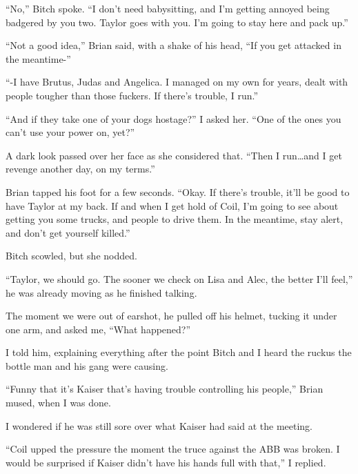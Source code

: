 ``No,'' Bitch spoke.  ``I don't need babysitting, and I'm getting annoyed being badgered by you two.  Taylor goes with you.  I'm going to stay here and pack up.''



``Not a good idea,'' Brian said, with a shake of his head, ``If you get attacked in the meantime-''



``-I have Brutus, Judas and Angelica.  I managed on my own for years, dealt with people tougher than those fuckers.  If there's trouble, I run.''



``And if they take one of your dogs hostage?'' I asked her.  ``One of the ones you can't use your power on, yet?''



A dark look passed over her face as she considered that.  ``Then I run\ldots and I get revenge another day, on my terms.''



Brian tapped his foot for a few seconds.  ``Okay.  If there's trouble, it'll be good to have Taylor at my back.  If and when I get hold of Coil, I'm going to see about getting you some trucks, and people to drive them.  In the meantime, stay alert, and don't get yourself killed.''



Bitch scowled, but she nodded.



``Taylor, we should go.  The sooner we check on Lisa and Alec, the better I'll feel,'' he was already moving as he finished talking.



The moment we were out of earshot, he pulled off his helmet, tucking it under one arm, and asked me, ``What happened?''



I told him, explaining everything after the point Bitch and I heard the ruckus the bottle man and his gang were causing.



``Funny that it's Kaiser that's having trouble controlling his people,'' Brian mused, when I was done.



I wondered if he was still sore over what Kaiser had said at the meeting.



``Coil upped the pressure the moment the truce against the ABB was broken.  I would be surprised if Kaiser didn't have his hands full with that,'' I replied.



